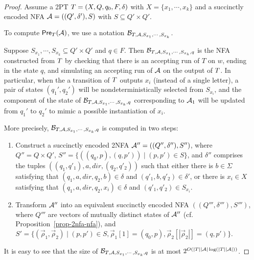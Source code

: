 \begin{proof}
Assume a 2PT $T=(X, Q, q_0, F, \delta)$ with $X = \{x_1,\cdots, x_k\}$ and a succinctly encoded NFA $\mathcal{A} = ((Q', \delta'), S)$ with $S \subseteq Q' \times Q'$. %

To compute $\textsf{Pre}_{T}(\mathcal{A})$, we use a notation $\mathcal{B}_{T, \mathcal{A}, S_{x_1}, \cdots, S_{x_k}}$. 

Suppose $S_{x_1}, \cdots, S_{x_k} \subseteq Q' \times Q'$ and $q \in F$. %
%
Then $\mathcal{B}_{T, \mathcal{A}, S_{x_1}, \cdots, S_{x_k}, q}$ is the NFA constructed from $T$  by checking that there is an accepting run of $T$ on $w$, ending in the state $q$, and simulating an accepting run of $\mathcal{A}$ on the output of $T$. In particular, when the a transition of $T$ outputs $x_i$ (instead of a single letter), a pair of states $(q_1', q_2')$ will be nondeterministically selected from $S_{x_i}$, and the component of the state of $\mathcal{B}_{T, \mathcal{A}, S_{x_1}, \cdots, S_{x_k}, q}$ corresponding to $\mathcal{A}_1$ will be updated from $q_1'$ to $q_2'$ to mimic a possible instantiation of $x_i$.  



More precisely, $\mathcal{B}_{T, \mathcal{A}, S_{x_1}, \cdots, S_{x_k}, q}$ is computed in two steps:
\begin{enumerate} 
\item Construct a succinctly encoded 2NFA $\mathcal{A}'' = ((Q'', \delta''), S'')$, where $Q'' = Q \times Q'$, $S'' = \{((q_0, p), (q, p')) \mid (p, p') \in S\}$, and $\delta''$ comprises the tuples $((q_1, q'_1), a, dir, (q_2, q'_2))$ such that either there is $b \in \Sigma$ satisfying that $(q_1, a, dir, q_2, b) \in \delta$ and $(q'_1, b, q'_2) \in \delta'$, or there is $x_i \in X$ satisfying that $(q_1, a, dir, q_2, x_i) \in \delta$  and $(q'_1, q'_2) \in S_{x_i}$.
%
\item Transform $\mathcal{A}''$ into an equivalent succinctly encoded NFA $((Q''',\delta'''), S''')$, where $Q'''$ are vectors of mutually distinct states of $\mathcal{A}''$ (cf. Proposition~\ref{prop-2nfa-nfa}),  and $S' = \{(\vec{\rho}_1, \vec{\rho}_2) \mid  (p, p') \in S, \vec{\rho}_1[1] =(q_0, p), \vec{\rho}_2[|\vec{\rho}_2|] = (q, p') \}$.
%
\end{enumerate} 
It is easy to see that  the size of $\mathcal{B}_{T, \mathcal{A}, S_{x_1}, \cdots, S_{x_k}, q}$ is at most 
$2^{O(|T||\mathcal{A}| \log(|T||\mathcal{A}|))}$.   


\end{proof}
